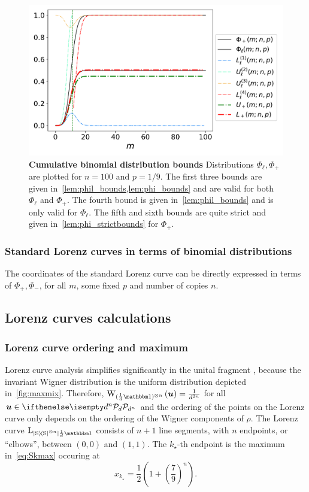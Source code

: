 \documentclass[pra,
aps,
twocolumn,
superscriptaddress,
groupedaddress,
nofootinbib,
reprint
]{revtex4-1}
\begin{document}
\begin{figure}
    \centering
    \includegraphics[scale=0.5]{figs/phi_bounds.pdf}
    \caption{\textbf{Cumulative binomial distribution bounds}
    Distributions $\Phi_\ell, \Phi_+$ are plotted for $n=100$ and $p=1/9$.
    The first three bounds are given in~\cref{lem:phil_bounds,lem:phi_bounds} and are valid for both $\Phi_\ell$ and $\Phi_+$.
    The fourth bound is given in~\cref{lem:phil_bounds} and is only valid for $\Phi_\ell$.
    The fifth and sixth bounds are quite strict and given in~\cref{lem:phi_strictbounds} for $\Phi_+$.
    }
    \label{fig:lccalc}
\end{figure}

\subsubsection{Standard Lorenz curves in terms of binomial distributions}
The coordinates of the standard Lorenz curve can be directly expressed in terms of $\Phi_+, \Phi_-$, for all $m$, some fixed $p$ and number of copies $n$.


\null\newpage
\null\newpage


\subsection{Lorenz curves calculations}

\subsubsection{Lorenz curve ordering and maximum}

Lorenz curve analysis simplifies significantly in the unital fragment , because the invariant Wigner distribution is the uniform distribution depicted in~\cref{fig:maxmix}.
Therefore, $\W[\bmu]{(\frac{1}{d}\id)^{\otimes n}} = \frac{1}{d^{2n}}$ for all $\bmu \in \pd[d^n]$ and the ordering of the points on the Lorenz curve only depends on the ordering of the Wigner components of $\rho$.
The Lorenz curve $\lc{\ketbra{\rm{S}}^{\otimes n}}{\frac{1}{d}\id}$ consists of $n+1$ line segments, with $n$ endpoints, or ``elbows'', between $(0,0)$ and $(1,1)$. 
The $k_\star$-th endpoint is the maximum in~\cref{eq:Skmax} occuring at 
\begin{equation}
	x_{k_\star} = \frac{1}{2}\left(1 + \left( \frac{7}{9} \right)^n \right).
\end{equation}
\end{document}
